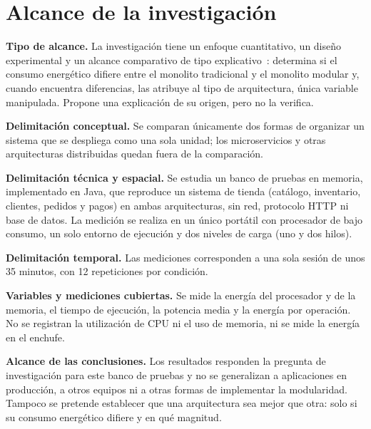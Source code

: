 \chapter{Alcance de la investigación}
\label{cap:alcance}

\textbf{Tipo de alcance.} La investigación tiene un enfoque cuantitativo, un diseño experimental y un alcance comparativo de tipo explicativo~\cite{hernandez2018metodologia}: determina si el consumo energético difiere entre el monolito tradicional y el monolito modular y, cuando encuentra diferencias, las atribuye al tipo de arquitectura, única variable manipulada. Propone una explicación de su origen, pero no la verifica.

\textbf{Delimitación conceptual.} Se comparan únicamente dos formas de organizar un sistema que se despliega como una sola unidad; los microservicios y otras arquitecturas distribuidas quedan fuera de la comparación.

\textbf{Delimitación técnica y espacial.} Se estudia un banco de pruebas en memoria, implementado en Java, que reproduce un sistema de tienda (catálogo, inventario, clientes, pedidos y pagos) en ambas arquitecturas, sin red, protocolo HTTP ni base de datos. La medición se realiza en un único portátil con procesador de bajo consumo, un solo entorno de ejecución y dos niveles de carga (uno y dos hilos).

\textbf{Delimitación temporal.} Las mediciones corresponden a una sola sesión de unos 35 minutos, con 12 repeticiones por condición.

\textbf{Variables y mediciones cubiertas.} Se mide la energía del procesador y de la memoria, el tiempo de ejecución, la potencia media y la energía por operación. No se registran la utilización de CPU ni el uso de memoria, ni se mide la energía en el enchufe.

\textbf{Alcance de las conclusiones.} Los resultados responden la pregunta de investigación para este banco de pruebas y no se generalizan a aplicaciones en producción, a otros equipos ni a otras formas de implementar la modularidad. Tampoco se pretende establecer que una arquitectura sea mejor que otra: solo si su consumo energético difiere y en qué magnitud.
